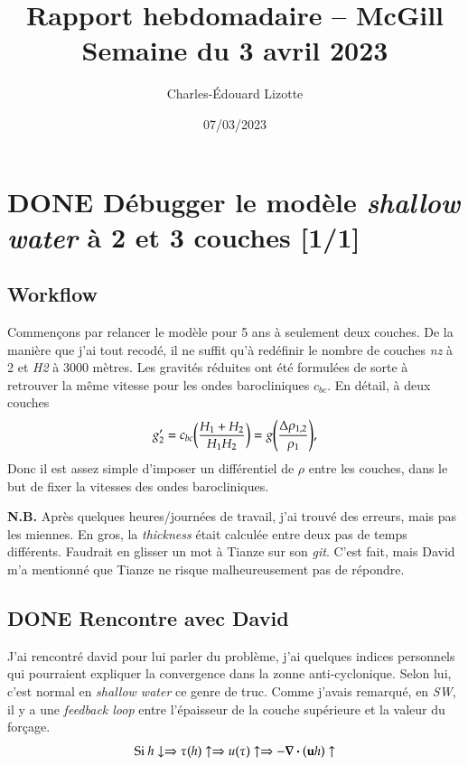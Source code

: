 \documentclass[10pt]{article}
\author{Charles-Édouard Lizotte}
\date{07/03/2023}
\title{Rapport hebdomadaire -- McGill\\\medskip
\large Semaine du 3 avril 2023}
\numberwithin{equation}{section}
\begin{document}
\maketitle
\tableofcontents


\section{{\bfseries\sffamily DONE} Débugger le modèle \emph{shallow water} à 2 et 3 couches [1/1]}
\label{sec:orgd45e5c9}
\subsection{Workflow}
\label{sec:org4cda573}
Commençons par relancer le modèle pour 5 ans à seulement deux couches.
De la manière que j'ai tout recodé, il ne suffit qu'à redéfinir le nombre de couches \emph{nz} à 2 et \emph{H2} à 3000 mètres.
Les gravités réduites ont été formulées de sorte à retrouver la même vitesse pour les ondes barocliniques \(c_{bc}\).
En détail, à deux couches
\begin{equation}
g_2' = c_{bc} \qty(\frac{H_1+H_2}{H_1H_2}) = g \qty(\frac{\Delta \rho_{1,2}}{\rho_1}),
\end{equation}
Donc il est assez simple d'imposer un différentiel de \(\rho\) entre les couches, dans le but de fixer la vitesses des ondes barocliniques.

\textbf{N.B.} Après quelques heures/journées de travail, j'ai trouvé des erreurs, mais pas les miennes.
En gros, la \emph{thickness} était calculée entre deux pas de temps différents.
Faudrait en glisser un mot à Tianze sur son \emph{git}.
C'est fait, mais David m'a mentionné que Tianze ne risque malheureusement pas de répondre.

\subsection{{\bfseries\sffamily DONE} Rencontre avec David}
\label{sec:orgeda10fe}
J'ai rencontré david pour lui parler du problème, j'ai quelques indices personnels qui pourraient expliquer la convergence dans la zonne anti-cyclonique. 
Selon lui, c'est normal en \emph{shallow water} ce genre de truc.
Comme j'avais remarqué, en \emph{SW}, il y a une \emph{feedback loop} entre l'épaisseur de la couche supérieure et la valeur du forçage.
\begin{equation}
\text{Si } h \downarrow
\Rightarrow \tau (h) \uparrow
\Rightarrow u(\tau) \uparrow
\Rightarrow -\divergence(\vb{u}h) \uparrow
\end{equation}
\end{document}
